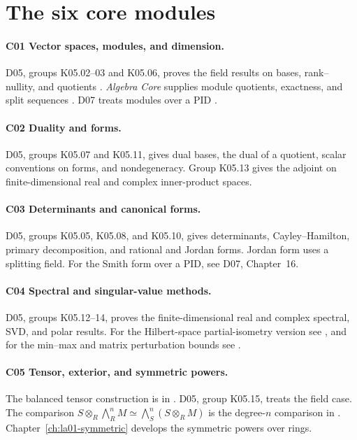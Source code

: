 \documentclass[11pt,oneside,openany]{book}
\theoremstyle{definition}
\theoremstyle{remark}
\begin{document}
\section*{The six core modules}

\paragraph{C01 \enspace Vector spaces, modules, and dimension.}
D05, groups K05.02--03 and K05.06, proves the field results on bases,
rank--nullity, and quotients \cite{d05}.
\emph{Algebra Core} supplies module quotients, exactness, and split
sequences \cite[Ch.~1]{p103}. D07 treats modules over a PID \cite[Ch.~16]{d07}.

\paragraph{C02 \enspace Duality and forms.}
D05, groups K05.07 and K05.11, gives dual bases, the dual of a quotient,
scalar conventions on forms, and nondegeneracy.
Group K05.13 gives the adjoint on finite-dimensional real and complex
inner-product spaces.

\paragraph{C03 \enspace Determinants and canonical forms.}
D05, groups K05.05, K05.08, and K05.10, gives determinants, Cayley--Hamilton,
primary decomposition, and rational and Jordan forms.
Jordan form uses a splitting field. For the Smith form over a PID,
see D07, Chapter~16.

\paragraph{C04 \enspace Spectral and singular-value methods.}
D05, groups K05.12--14, proves the finite-dimensional real and complex
spectral, SVD, and polar results. For the Hilbert-space partial-isometry
version see \cite{d16}, and for the min--max and matrix perturbation
bounds see \cite{p206}.

\paragraph{C05 \enspace Tensor, exterior, and symmetric powers.}
The balanced tensor construction is in \cite[Ch.~1]{p103}. D05,
group K05.15, treats the field case. The comparison
\(S\otimes_R\bigwedge_R^n M\simeq\bigwedge_S^n(S\otimes_R M)\)
is the degree-\(n\) comparison in \cite[RK-03 and RK-04]{commalg}.
Chapter~\ref{ch:la01-symmetric} develops the symmetric powers over rings.
\end{document}
